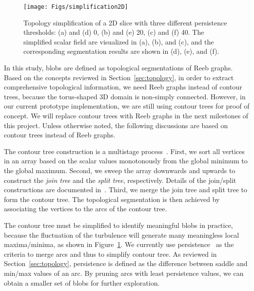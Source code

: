 
\begin{figure}
  \centering
  \texttt{[image: Figs/simplification2D]}
  \caption{Topology simplification of a 2D slice with three different persistence thresholds: (a) and (d) 0, (b) and (e) 20, (c) and (f) 40.  The simplified scalar field are visualized in (a), (b), and (c), and the corresponding segmentation results are shown in (d), (e), and (f).}
  \label{fig:simplification2D}
\end{figure}


In this study, blobs are defined as topological segmentations of Reeb graphs.  Based on the concepts reviewed in Section~\ref{sec:topology}, in order to extract comprehensive topological information, we need Reeb graphs instead of contour trees, because the torus-shaped 3D domain is non-simply connected.  However, in our current prototype implementation, we are still using contour trees for proof of concept.  We will replace contour trees with Reeb graphs in the next milestones of this project.  Unless otherwise noted, the following discussions are based on contour trees instead of Reeb graphs.  

The contour tree construction is a multistage process~\cite{CarrSA00}.  First, we sort all vertices in an array based on the scalar values monotonously from the global minimum to the global maximum.  Second, we sweep the array downwards and upwards to construct the \emph{join tree} and the \emph{split tree}, respectively.  Details of the join/split constructions are documented in~\cite{CarrSA00}.  Third, we merge the join tree and split tree to form the contour tree.  The topological segmentation is then achieved by associating the vertices to the arcs of the contour tree.  

The contour tree must be simplified to identify meaningful blobs in practice, because the fluctuation of the turbulence will generate many meaningless local maxima/minima, as shown in Figure~\ref{fig:simplification2D}.  We currently use persistence~\cite{EdelsbrunnerLZ02} as the criteria to merge arcs and thus to simplify contour tree.  As reviewed in Section~\ref{sec:topology}, persistence is defined as the difference between saddle and min/max values of an arc.  By pruning arcs with least persistence values, we can obtain a smaller set of blobs for further exploration.  

